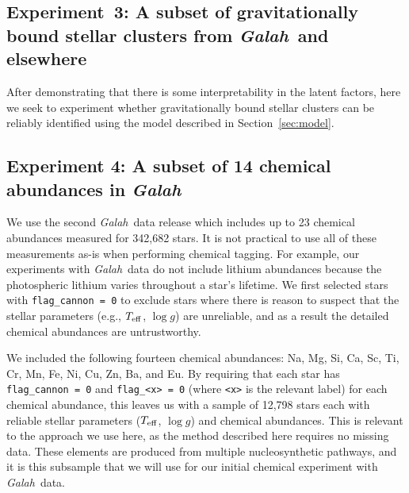 \documentclass[twocolumn]{aastex61}
\newcommand\teff{T_{\rm eff}}
\newcommand\logg{\log{g}}
\newcommand{\project}[1]{\textsl{#1}}
\newcommand{\Galah}{\project{Galah}}
\begin{document}
\subsection{Experiment~3: A subset of gravitationally bound stellar clusters 
			from \Galah\ and elsewhere}
\label{sec:exp3}

After demonstrating that there is some interpretability in the latent factors,
here we seek to experiment whether gravitationally bound stellar clusters can
be reliably identified using the model described in Section~\ref{sec:model}.






\subsection{Experiment 4: A subset of 14 chemical abundances in \Galah}
\label{sec:experiment-galah}


We use the second \Galah\ data release \citep{Buder:2018a} which
includes up to 23 chemical abundances measured for 342,682
stars. It is not practical to use all of these measurements as-is
when performing chemical tagging. For example, our experiments
with \Galah\ data do not include lithium abundances because the
photospheric lithium varies throughout a star's lifetime. 
We first selected stars with \texttt{flag\_cannon = 0} to exclude
stars where there is reason to suspect that the stellar parameters
(e.g., $\teff$, $\logg$) are unreliable, and as a result the 
detailed chemical abundances are untrustworthy. 

We included the following fourteen chemical abundances: Na, Mg, 
Si, Ca, Sc, Ti, Cr, Mn, Fe, Ni, Cu, Zn, Ba, and Eu.
By requiring that each star has \texttt{flag\_cannon = 0} and
\texttt{flag\_<x> = 0} (where \texttt{<x>} is the relevant label)
for each chemical abundance, this leaves
us with a sample of 12,798 stars each with reliable stellar
parameters ($\teff$, $\logg$) and chemical abundances.
This is relevant to the approach we use here, as the method
described here requires no missing data.
These elements are produced from multiple nucleosynthetic
pathways, and it is this subsample that we will use for 
our initial chemical experiment with \Galah\ data.




\end{document}
